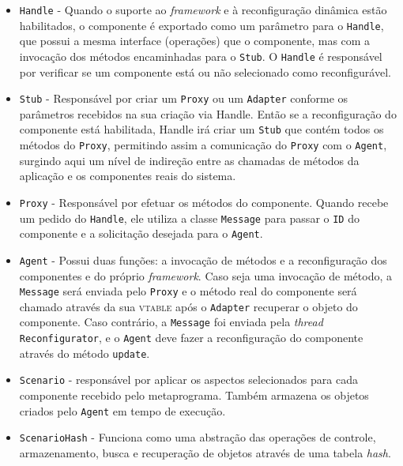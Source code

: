 \documentclass[12pt]{article}
\newcommand{\vtable}{\textsc{vtable}}
\begin{document}
\begin{itemize}
	\item \texttt{Handle} -  Quando o suporte ao \textit{framework} e à reconfiguração dinâmica estão habilitados, o componente é exportado como um parâmetro para o \texttt{Handle}, que possui a mesma interface (operações) que o componente, mas com a invocação dos métodos encaminhadas para o \texttt{Stub}. O \texttt{Handle} é responsável por verificar se um componente está ou não selecionado como reconfigurável.
	
	\item \texttt{Stub} - Responsável por criar um \texttt{Proxy} ou um \texttt{Adapter} conforme os parâmetros recebidos na sua criação via Handle. Então se a reconfiguração do componente está habilitada, Handle irá criar um \texttt{Stub} que contém todos os métodos do \texttt{Proxy}, permitindo assim a comunicação do \texttt{Proxy} com o \texttt{Agent}, surgindo aqui um nível de indireção entre as chamadas de métodos da aplicação e os componentes reais do sistema.
	 
	\item \texttt{Proxy} - Responsável por efetuar os métodos do componente. Quando recebe um pedido do \texttt{Handle}, ele utiliza a classe \texttt{Message} para passar o \texttt{ID} do componente e a solicitação desejada para o \texttt{Agent}.
	
	\item \texttt{Agent} - Possui duas funções: a invocação de métodos e a reconfiguração dos componentes e do próprio \textit{framework}. Caso seja uma invocação de método, a \texttt{Message} será enviada pelo \texttt{Proxy} e o método real do componente será chamado através da sua \vtable{} após o \texttt{Adapter} recuperar o objeto do componente. Caso contrário, a \texttt{Message} foi enviada pela \textit{thread} \texttt{Reconfigurator}, e o \texttt{Agent} deve fazer a reconfiguração do componente através do método \texttt{update}.
	
	\item \texttt{Scenario} - responsável por aplicar os aspectos selecionados para cada componente recebido pelo metaprograma. Também armazena os objetos criados pelo \texttt{Agent} em tempo de execução.
	
	\item \texttt{ScenarioHash} - Funciona como uma abstração das operações de controle, armazenamento, busca e recuperação de objetos através de uma tabela \textit{hash}.
\end{itemize}
\end{document}
